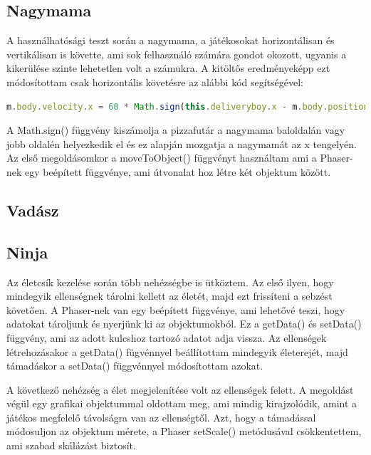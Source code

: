 \documentclass[12pt, a4paper]{report}
\theoremstyle{definition}
\begin{document}
	\subsection{Nagymama}
	A használhatósági teszt során a nagymama, a játékosokat horizontálisan és vertikálisan is követte, ami sok felhasználó számára gondot okozott, ugyanis a kikerülése szinte lehetetlen volt a számukra. A kitöltős eredményeképp ezt módosítottam csak horizontális követésre az alábbi kód segítségével:
	
	\begin{lstlisting}[language=JavaScript]
		m.body.velocity.x = 60 * Math.sign(this.deliveryboy.x - m.body.position.x);
	\end{lstlisting}
	A Math.sign() függvény kiszámolja a pizzafutár a nagymama baloldalán vagy jobb oldalén helyezkedik el és ez alapján mozgatja a nagymamát az x tengelyén. Az első megoldásomkor a moveToObject() függvényt használtam ami a Phaser-nek egy beépített függvénye, ami útvonalat hoz létre két objektum között.
	
	\subsection{Vadász}
	
	
	\subsection{Ninja}
	Az életcsík kezelése során több nehézségbe is ütköztem. Az első ilyen, hogy mindegyik ellenségnek tárolni kellett az életét, majd ezt frissíteni a sebzést követően. A Phaser-nek van egy beépített függvénye, ami lehetővé teszi, hogy adatokat tároljunk és nyerjünk ki az objektumokból. Ez a getData() és setData() függvény, ami az adott kulcshoz tartozó adatot adja vissza. Az ellenségek létrehozásakor a getData() fügvénnyel beállítottam mindegyik életerejét, majd támadáskor a setData() függvénnyel módosítottam azokat.
	
	A következő nehézség a élet megjelenítése volt az ellenségek felett. A megoldást végül egy grafikai objektummal oldottam meg, ami mindig kirajzolódik, amint a játékos megfelelő távolságra van az ellenségtől. Azt, hogy a támadással módosuljon az objektum mérete, a Phaser setScale() metódusával csökkentettem, ami szabad skálázást biztosít.
	
\end{document}
